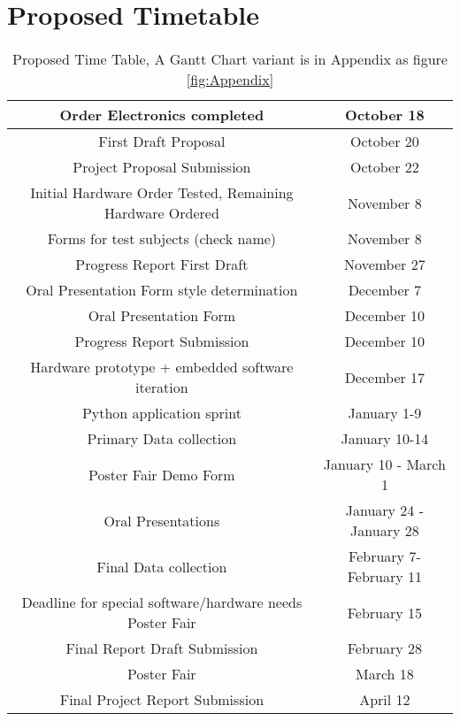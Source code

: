 \newpage
\section{Proposed Timetable}

\begin{table}[ht]
\begin{center}
\begin{tabular}{|c|c|}
\hline
Order Electronics completed &	October 18 \\ 
\hline
First Draft Proposal &	October 20 \\ 
\hline
Project Proposal Submission &	October 22 \\ 
\hline
Initial Hardware Order Tested, Remaining Hardware Ordered  &	November 8 \\ 
\hline
Forms for test subjects (check name) &	November 8 \\ 
\hline
Progress Report First Draft &	November 27 \\ 
	\hline
Oral Presentation Form style determination &	December 7 \\ 
	\hline
Oral Presentation Form &    December 10 \\ 
\hline
Progress Report Submission &    December 10 \\ 
\hline
Hardware prototype + embedded software iteration &	December 17 \\ 
\hline
Python application sprint &	January 1-9 \\ 
\hline
Primary Data collection &	January 10-14 \\ \hline
Poster Fair Demo Form & January 10 - March 1 \\ 
\hline
Oral Presentations &	January 24 - January 28 \\ 
\hline
Final Data collection &	February 7-February 11 \\ 
\hline

Deadline for special software/hardware needs Poster Fair &	February 15 \\ 
\hline
Final Report Draft Submission &	February 28 \\ 
\hline
Poster Fair &	March 18 \\ 
\hline
Final Project Report Submission &   April 12 \\ 
\hline
\hline
\end{tabular}
\caption{Proposed Time Table, A Gantt Chart variant is in Appendix as figure \ref{fig:Appendix}}
\label{table:1}
\end{center}
\end{table}
